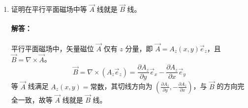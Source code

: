 \begin{enumerate}
    \paragraph{解答：}
    设分界面法向为 $\vec{e}_z$，无自由电流时，切向分量 $H_{1t}=H_{2t}$，法向分量 $B_{1n}=B_{2n}$。
    \begin{enumerate}
        \item $B_{2z}=B_{1z}=0.6\,\text{mT}$。
        $H_{1x} = \frac{B_{1x}}{\mu_0\mu_{r1}} = \frac{1.5\times10^{-3}}{\mu_0}$，$H_{1y} = \frac{0.8\times10^{-3}}{\mu_0}$。
        由 $H_{2x}=H_{1x}, H_{2y}=H_{1y}$，得：
        \[
        B_{2x} = \mu_0\mu_{r2}H_{2x} = 100 \times 1.5\times10^{-3} = 150\,\text{mT}
        \]
        \[
        B_{2y} = \mu_0\mu_{r2}H_{2y} = 100 \times 0.8\times10^{-3} = 80\,\text{mT}
        \]
        故 $\vec{B}_2 = 150\vec{e}_x + 80\vec{e}_y + 0.6\vec{e}_z\,\text{mT}$。

        \item 磁化强度 $\vec{M} = \frac{\vec{B}}{\mu_0} - \vec{H}$：
        \[
        \vec{M}_1 = \left(\frac{1.5\vec{e}_x+0.8\vec{e}_y+0.6\vec{e}_z}{\mu_0} - \frac{1.5\vec{e}_x+0.8\vec{e}_y+0.6\vec{e}_z}{\mu_0}\right) = 0
        \]
        \[
        \vec{M}_2 = \left(\frac{150\vec{e}_x+80\vec{e}_y+0.6\vec{e}_z}{\mu_0} - \frac{1.5\vec{e}_x+0.8\vec{e}_y+0.6\vec{e}_z}{\mu_0}\right) = \frac{148.5\vec{e}_x + 79.2\vec{e}_y}{\mu_0}\times10^{-3}\,\text{A/m}
        \]
        界面磁化面电流密度：
        \[
        \vec{J}_{ms} = \vec{e}_z \times (\vec{M}_2 - \vec{M}_1) = \vec{e}_z \times \vec{M}_2 = \frac{1}{\mu_0}(-79.2\vec{e}_x + 148.5\vec{e}_y)\times10^{-3}\,\text{A/m}
        \]
    \end{enumerate}

    \item 证明在平行平面磁场中等 $\vec{A}$ 线就是 $\vec{B}$ 线。

    \paragraph{解答：}
    平行平面磁场中，矢量磁位 $\vec{A}$ 仅有 $z$ 分量，即 $\vec{A}=A_z(x,y)\vec{e}_z$，且 $\vec{B}=\nabla\times\vec{A}$。
    \[
    \vec{B} = \nabla\times(A_z\vec{e}_z) = \frac{\partial A_z}{\partial y}\vec{e}_x - \frac{\partial A_z}{\partial x}\vec{e}_y
    \]
    等 $\vec{A}$ 线满足 $A_z(x,y)=\text{常数}$，其切线方向为 $\left(\frac{\partial A_z}{\partial y}, -\frac{\partial A_z}{\partial x}\right)$，与 $\vec{B}$ 的方向完全一致，故等 $\vec{A}$ 线就是 $\vec{B}$ 线。


\end{enumerate}
